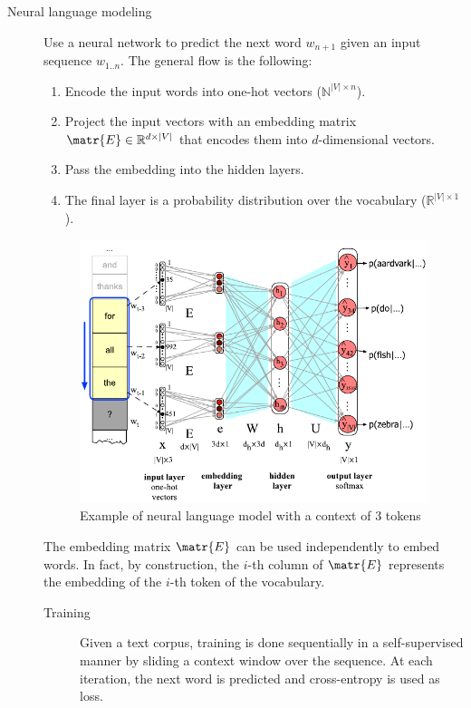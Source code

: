 \begin{description}
    \item[Neural language modeling] 
        Use a neural network to predict the next word $w_{n+1}$ given an input sequence $w_{1..n}$. The general flow is the following:
        \begin{enumerate}
            \item Encode the input words into one-hot vectors ($\mathbb{N}^{|V| \times n}$). 
            \item Project the input vectors with an embedding matrix $\matr{E} \in \mathbb{R}^{d \times |V|}$ that encodes them into $d$-dimensional vectors.
            \item Pass the embedding into the hidden layers.
            \item The final layer is a probability distribution over the vocabulary ($\mathbb{R}^{|V| \times 1}$).
        \end{enumerate}

        \begin{figure}[H]
            \centering
            \includegraphics[width=0.5\linewidth]{./img/_neural_language_model_example.pdf}
            \caption{Example of neural language model with a context of $3$ tokens}
        \end{figure}

        \begin{remark}
            The embedding matrix $\matr{E}$ can be used independently to embed words. In fact, by construction, the $i$-th column of $\matr{E}$ represents the embedding of the $i$-th token of the vocabulary.
        \end{remark}

        \begin{description}
            \item[Training] 
                Given a text corpus, training is done sequentially in a self-supervised manner by sliding a context window over the sequence. At each iteration, the next word is predicted and cross-entropy is used as loss.


\end{description}
\end{description}
